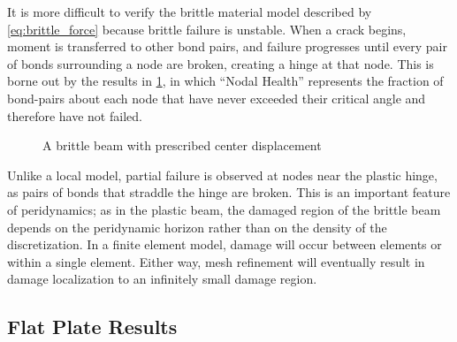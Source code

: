 It is more difficult to verify the brittle material model described by \cref{eq:brittle_force} because brittle failure is unstable.
When a crack begins, moment is transferred to other bond pairs, and failure progresses until every pair of bonds surrounding a node are broken, creating a hinge at that node.
This is borne out by the results in \cref{fig:brittleBeam}, in which ``Nodal Health'' represents the fraction of bond-pairs about each node that have never exceeded their critical angle and therefore have not failed.

\begin{figure}[h]
  \centering
  \resizebox{0.7\linewidth}{!}{}
  \caption{A brittle beam with prescribed center displacement}
  \label{fig:brittleBeam}
\end{figure}

Unlike a local model, partial failure is observed at nodes near the plastic hinge, as pairs of bonds that straddle the hinge are broken.
This is an important feature of peridynamics; as in the plastic beam, the damaged region of the brittle beam depends on the peridynamic horizon rather than on the density of the discretization.
In a finite element model, damage will occur between elements or within a single element.
Either way, mesh refinement will eventually result in damage localization to an infinitely small damage region.

\FloatBarrier
\subsection{Flat Plate Results}

